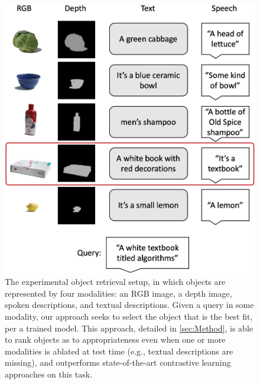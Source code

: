 \documentclass[sigconf,natbib=true,anonymous=true]{acmart}
\begin{document}
\begin{figure}[tb]
\centering
\includegraphics[width=.99\columnwidth]{Figures/experiment-setup.png}
\caption{
The experimental object retrieval setup, in which objects are represented by four modalities: an RGB image, a depth image, spoken descriptions, and textual descriptions. Given a query in some modality, our approach seeks to select the object that is the best fit, per a trained model. This approach, detailed in \cref{sec:Method}, is able to rank objects as to appropriateness even when one or more modalities is ablated at test time (e.g., textual descriptions are missing), and outperforms state-of-the-art contrastive learning approaches on this task.
}
\label{fig:experimental-setup}
\end{figure}
\end{document}
